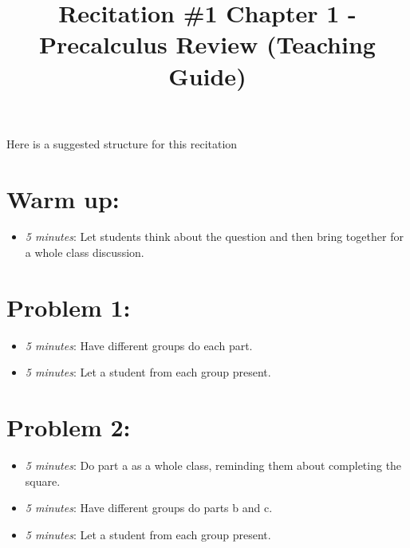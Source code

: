 \documentclass[handout,nooutcomes]{ximera}
\title{Recitation \#1 Chapter 1 - Precalculus Review (Teaching Guide)}
\begin{document}
\begin{abstract}		\end{abstract}
\maketitle

Here is a suggested structure for this recitation

\section*{Warm up:}  

	\begin{itemize}
	
	\item  \emph{5 minutes}:  Let students think about the question and then bring together for a whole class discussion.

	\end{itemize}


\section*{Problem 1:}

	\begin{itemize}
	
	\item  \emph{5 minutes}: Have different groups do each part.
	
	\item  \emph{5 minutes}: Let a student from each group present.
	
	\end{itemize}
	
	
	
\section*{Problem 2:}

	\begin{itemize}
	
	\item  \emph{5 minutes}:  Do part a as a whole class, reminding them about completing the square.
	
	\item  \emph{5 minutes}: Have different groups do parts b and c.
	
	\item  \emph{5 minutes}: Let a student from each group present.
	
	\end{itemize}
	
\end{document}
